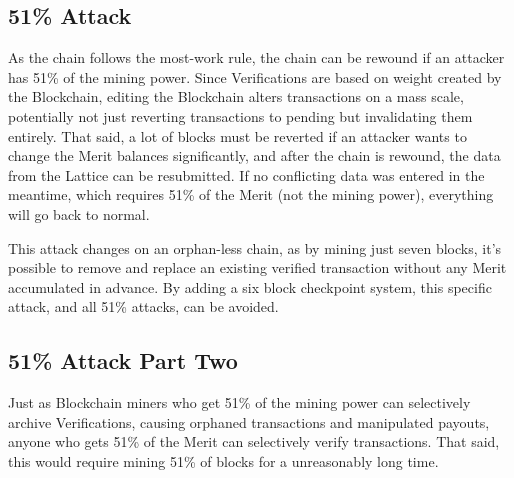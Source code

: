 \documentclass[14pt]{article}
\begin{document}
\label{sec:3.2}
\subsection{51\% Attack}
As the chain follows the most-work rule, the chain can be rewound if an attacker has 51\% of the mining power. Since Verifications are based on weight created by the Blockchain, editing the Blockchain alters transactions on a mass scale, potentially not just reverting transactions to pending but invalidating them entirely. That said, a lot of blocks must be reverted if an attacker wants to change the Merit balances significantly, and after the chain is rewound, the data from the Lattice can be resubmitted. If no conflicting data was entered in the meantime, which requires 51\% of the Merit (not the mining power), everything will go back to normal.

This attack changes on an orphan-less chain, as by mining just seven blocks, it's possible to remove and replace an existing verified transaction without any Merit accumulated in advance. By adding a six block checkpoint system, this specific attack, and all 51\% attacks, can be avoided.

\label{sec:3.3}
\subsection{51\% Attack Part Two}
Just as Blockchain miners who get 51\% of the mining power can selectively archive Verifications, causing orphaned transactions and manipulated payouts, anyone who gets 51\% of the Merit can selectively verify transactions. That said, this would require mining 51\% of blocks for a unreasonably long time.
\end{document}
